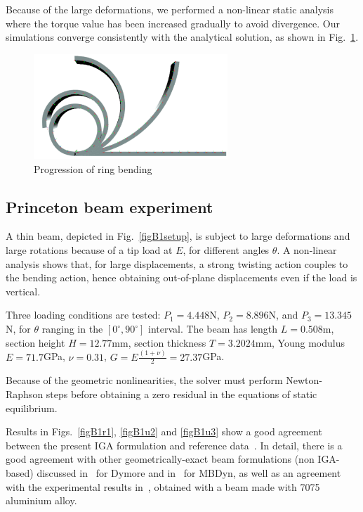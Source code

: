 \documentclass[review]{elsarticle}
\begin{document}
Because of the large deformations, we performed a non-linear static analysis where the torque value has been increased gradually to avoid divergence. Our simulations converge consistently with the analytical solution, as shown in Fig.~\ref{figringbending}.

\begin{figure}[ht]
\centering
\includegraphics[width=0.65\textwidth]{benchmark_RingBending/bending_progression.pdf}
\caption{Progression of ring bending}
\label{figringbending}
\end{figure}


\subsection{Princeton beam experiment}

A thin beam, depicted in Fig.~\ref{figB1setup}, is subject to large deformations and large rotations because of a tip load at $E$, for different angles $\theta$. A non-linear analysis shows that, for large displacements, a strong twisting action couples to the bending action, hence obtaining out-of-plane displacements even if the load is vertical.

Three loading conditions are tested: $P_1 = 4.448$N, $P_2 = 8.896$N,
and $P_3 = 13.345$N, for $\theta$ ranging in the $[0^\circ,90^\circ]$ interval.
The beam has length $L = 0.508$m, section height $H = 12.77$mm, section thickness $T = 3.2024$mm, Young modulus $E = 71.7$GPa, $\nu = 0.31$, $G = E \frac{(1 + \nu)}{2} = 27.37$GPa. 

Because of the geometric nonlinearities, the solver must perform Newton-Raphson steps
before obtaining a zero residual in the equations of static equilibrium.

Results in Figs.~\ref{figB1r1}, \ref{figB1u2} and \ref{figB1u3} show a good agreement
between the present IGA formulation and reference data~\cite{BAUCHAU-2014-IMSD}. In detail, there is a good agreement with other geometrically-exact beam formulations (non IGA-based) discussed in~\cite{BAUCHAU-DYMORE} for Dymore and in~\cite{FV-AIAA} for MBDyn, 
as well as an agreement with the experimental results
in~\cite{DOWELL-1975-PRINCETON-1194,DOWELL-1975-PRINCETON-1257}, obtained with a beam made with 7075 aluminium alloy.
\end{document}
